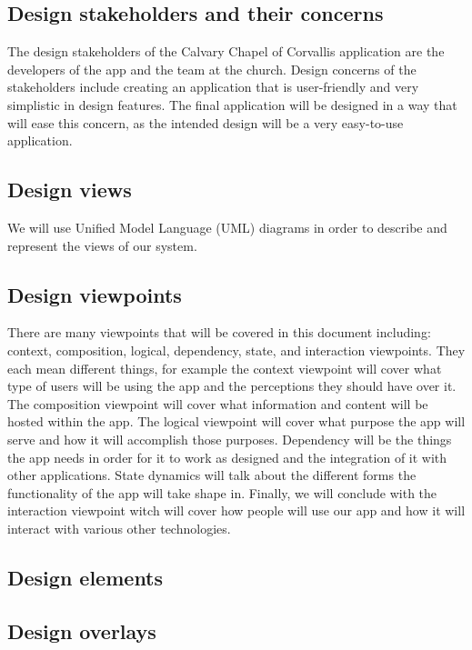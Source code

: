 \documentclass[letterpaper,10pt,draftclsnofoot,onecolumn,titlepage]{IEEEtran}
\begin{document}
		\subsection{Design stakeholders and their concerns}
			The design stakeholders of the Calvary Chapel of Corvallis application are the developers of the app and the team at the church.
			Design concerns of the stakeholders include creating an application that is user-friendly and very simplistic in design features.
			The final application will be designed in a way that will ease this concern, as the intended design will be a very easy-to-use application.

		\subsection{Design views}
		We will use Unified Model Language (UML) diagrams in order to describe and represent the views of our system.

		\subsection{Design viewpoints}
		There are many viewpoints that will be covered in this document including: context, composition, logical, dependency, state, and interaction viewpoints.
		They each mean different things, for example the context viewpoint will cover what type of users will be using the app and the perceptions they should have over it.
		The composition viewpoint will cover what information and content will be hosted within the app.
		The logical viewpoint will cover what purpose the app will serve and how it will accomplish those purposes.
		Dependency will be the things the app needs in order for it to work as designed and the integration of it with other applications.
		State dynamics will talk about the different forms the functionality of the app will take shape in.
		Finally, we will conclude with the interaction viewpoint witch will cover how people will use our app and how it will interact with various other technologies.

		\subsection{Design elements}

		\subsection{Design overlays}
\end{document}
